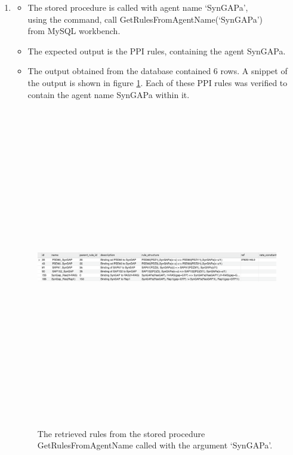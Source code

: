 \documentclass[msc,deptreport,ai]{infthesis}      %
\begin{document}
\begin{enumerate}
	\item 
	\begin{itemize}
		\item 	The stored procedure is called with agent name `SynGAPa',\\
		using the command, call GetRulesFromAgentName(`SynGAPa')\\
		from MySQL workbench.
		\item The expected output is the PPI rules, containing the agent SynGAPa.
		\item The output obtained from the database contained 6 rows. A snippet of the output is shown in figure \ref{fig:AgentNameOutput2}. Each of these PPI rules was verified to contain the agent name SynGAPa within it.
	\end{itemize}
		\begin{figure}[H]
		\centering
		\captionsetup{justification=centering}
		\includegraphics[width=\linewidth,height=14cm,keepaspectratio]{AgentNameOutput2.png}	
		\caption{The retrieved rules from the stored procedure GetRulesFromAgentName called with the argument `SynGAPa'.}
		\label{fig:AgentNameOutput2}		
	\end{figure}
\end{enumerate}
\end{document}
